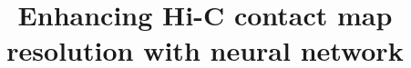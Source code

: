 \documentclass{article}
\begin{document}
\title{Enhancing Hi-C contact map resolution with neural network}
\author{}
\maketitle
    
    
\end{document}
